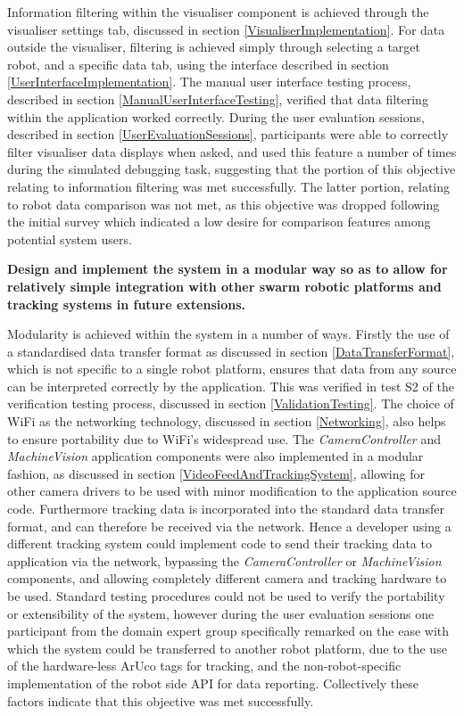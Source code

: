 Information filtering within the visualiser component is achieved through the visualiser settings tab, discussed in section \ref{VisualiserImplementation}. For data outside the visualiser, filtering is achieved simply through selecting a target robot, and a specific data tab, using the interface described in section \ref{UserInterfaceImplementation}. The manual user interface testing process, described in section \ref{ManualUserInterfaceTesting}, verified that data filtering within the application worked correctly. During the user evaluation sessions, described in section \ref{UserEvaluationSessions}, participants were able to correctly filter visualiser data displays when asked, and used this feature a number of times during the simulated debugging task, suggesting that the portion of this objective relating to information filtering was met successfully. The latter portion, relating to robot data comparison was not met, as this objective was dropped following the initial survey which indicated a low desire for comparison features among potential system users.

\noindent \textbf{Design and implement the system in a modular way so as to allow for relatively simple integration with other swarm robotic platforms and tracking systems in future extensions.}

Modularity is achieved within the system in a number of ways. Firstly the use of a standardised data transfer format as discussed in section \ref{DataTransferFormat}, which is not specific to a single robot platform, ensures that data from any source can be interpreted correctly by the application. This was verified in test S2 of the verification testing process, discussed in section \ref{ValidationTesting}. The choice of WiFi as the networking technology, discussed in section \ref{Networking}, also helps to ensure portability due to WiFi's widespread use. The \textit{CameraController} and \textit{MachineVision} application components were also implemented in a modular fashion, as discussed in section \ref{VideoFeedAndTrackingSystem}, allowing for other camera drivers to be used with minor modification to the application source code. Furthermore tracking data is incorporated into the standard data transfer format, and can therefore be received via the network. Hence a developer using a different tracking system could implement code to send their tracking data to application via the network, bypassing the \textit{CameraController} or \textit{MachineVision} components, and allowing completely different camera and tracking hardware to be used. Standard testing procedures could not be used to verify the portability or extensibility of the system, however during the user evaluation sessions one participant from the domain expert group specifically remarked on the ease with which the system could be transferred to another robot platform, due to the use of the hardware-less ArUco tags for tracking, and the non-robot-specific implementation of the robot side API for data reporting. Collectively these factors indicate that this objective was met successfully.

